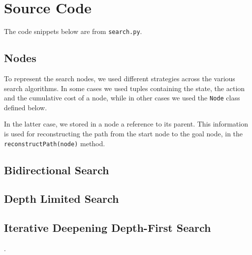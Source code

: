 \chapter{Source Code} 

The code snippets below are from \verb|search.py|.



\section{Nodes}
\label{sec:nodes}

To represent the search nodes, we used different strategies across the various search algorithms. In some cases we used tuples containing the state, the action and the cumulative cost of a node, while in other cases we used the \verb|Node| class defined below.

In the latter case, we stored in a node a reference to its parent. This information is used for reconstructing the path from the start node to the goal node, in the \verb|reconstructPath(node)| method.




  
  
  
\section{Bidirectional Search}
\label{sec:code_bs}





\section{Depth Limited Search}
\label{sec:code_dls}





\section{Iterative Deepening Depth-First Search}
\label{sec:code_iddfs}.

